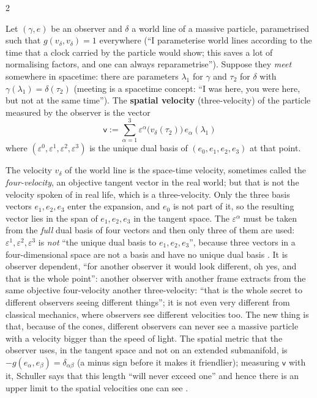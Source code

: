 \begin{paracol}{2}
\begin{definition}\label{def:c13-p4}
Let $(\gamma,e)$ be an observer and $\delta$ a world line of a massive particle, parametrised such that $g(v_\delta,v_\delta)=1$ everywhere (``I parameterise world lines according to the time that a clock carried by the particle would show; this saves a lot of normalising factors, and one can always reparametrise''). Suppose they \emph{meet} somewhere in spacetime: there are parameters $\lambda_1$ for $\gamma$ and $\tau_2$ for $\delta$ with $\gamma(\lambda_1)=\delta(\tau_2)$ (meeting is a spacetime concept: ``I was here, you were here, but not at the same time''). The \textbf{spatial velocity} (three-velocity) of the particle measured by the observer is the vector
\[
  \mathsf v:=\sum_{\alpha=1}^{3}\varepsilon^\alpha\bigl(v_\delta(\tau_2)\bigr)\,e_\alpha(\lambda_1)
\]
where $(\varepsilon^0,\varepsilon^1,\varepsilon^2,\varepsilon^3)$ is the unique dual basis of $(e_0,e_1,e_2,e_3)$ at that point.
\end{definition}
The velocity $v_\delta$ of the world line is the space-time velocity, sometimes called the \emph{four-velocity}, an objective tangent vector in the real world; but that is not the velocity spoken of in real life, which is a three-velocity. Only the three basis vectors $e_1,e_2,e_3$ enter the expansion, and $e_0$ is not part of it, so the resulting vector lies in the span of $e_1,e_2,e_3$ in the tangent space. The $\varepsilon^\alpha$ must be taken from the \emph{full} dual basis of four vectors and then only three of them are used: $\varepsilon^1,\varepsilon^2,\varepsilon^3$ is \emph{not} ``the unique dual basis to $e_1,e_2,e_3$'', because three vectors in a four-dimensional space are not a basis and have no unique dual basis .
It is observer dependent, ``for another observer it would look different, oh yes, and that is the whole point'': another observer with another frame extracts from the same objective four-velocity another three-velocity: ``that is the whole secret to different observers seeing different things''; it is not even very different from classical mechanics, where observers see different velocities too. The new thing is that, because of the cones, different observers can never see a massive particle with a velocity bigger than the speed of light. The spatial metric that the observer uses, in the tangent space and not on an extended submanifold, is $-g(e_\alpha,e_\beta)=\delta_{\alpha\beta}$ (a minus sign before it makes it friendlier); measuring $\mathsf v$ with it, Schuller says that this length ``will never exceed one'' and hence there is an upper limit to the spatial velocities one can see .

\end{paracol}
